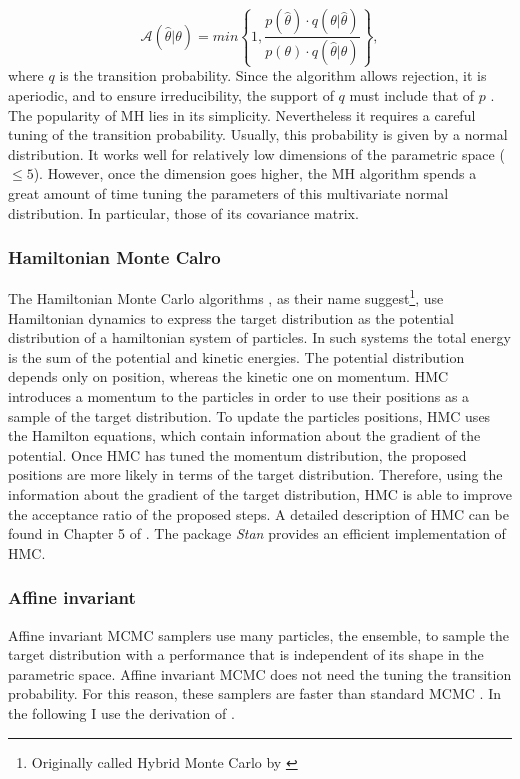 \begin{equation}
\mathcal{A}(\hat{\theta}|\theta)=min\left\{1,\frac{p(\hat{\theta})\cdot q(\theta|\hat{\theta})}{p(\theta)\cdot q(\hat{\theta}|\theta)}\right\},
\end{equation}
where $q$ is the transition probability. Since the algorithm allows rejection, it is aperiodic, and to ensure irreducibility, the support of $q$ must include that of $p$ \citep{Andrieu2003}. The popularity of MH lies in its simplicity. Nevertheless it requires a careful tuning of the transition probability. Usually, this probability is given by a normal distribution. It works well for relatively low dimensions of the parametric space ($\leq 5$). However, once the dimension goes higher, the MH algorithm spends a great amount of time tuning the parameters of this multivariate normal distribution. In particular, those of its covariance matrix.

\subsubsection{Hamiltonian Monte Calro}
The Hamiltonian Monte Carlo algorithms \citep{Duane1987,Neal1996}, as their name suggest\footnote{Originally called Hybrid Monte Carlo by \citep{Duane1987}}, use Hamiltonian dynamics to express the target distribution as the potential distribution of a hamiltonian system of particles. In such systems the total energy is the sum of the potential and kinetic energies. The potential distribution depends only on position, whereas the kinetic one on momentum. HMC introduces a momentum to the particles in order to use their positions as a sample of the target distribution. To update the particles positions, HMC uses the Hamilton equations, which contain information about the gradient of the potential. Once HMC has tuned the momentum distribution, the proposed positions are more likely in terms of the target distribution. Therefore, using the information about the gradient of the target distribution, HMC is able to improve the acceptance ratio of the proposed steps. A detailed description of HMC can be found in Chapter 5 of \citet{Brooks2011}. The package \emph{Stan} \citep{Stan} provides an efficient implementation of HMC.

\subsubsection{Affine invariant}
Affine invariant MCMC samplers use many particles, the ensemble, to sample the target distribution with a performance that is independent of its shape in the parametric space. Affine invariant MCMC does not need the tuning the transition probability. For this reason, these samplers are faster than standard MCMC \citep{Goodman2010}. In the following I use the derivation of \citet{Goodman2010}.



